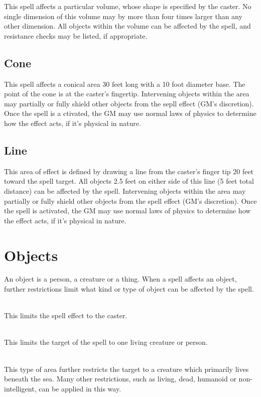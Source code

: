 \begin{multicols*}{2}
This spell affects a particular volume, whose shape is specified by the caster. No single dimension of this volume may by more than four times larger than any other dimension. All objects within the volume can be affected by the spell,
and resistance checks may be listed, if appropriate.
\subsection{Cone}

This spell affects a conical area 30 feet long with a 10 foot diameter base. The point of the cone is at the caster’s fingertip. Intervening objects within the area may partially or
fully shield other objects from the sepll effect (GM's discretion). Once the spell is a ctivated, the GM may use normal laws of physics to determine how the effect acts, if it’s physical in nature.
\subsection{Line}

This area of effect is defined by drawing a line from the caster’s finger tip 20 feet toward the spell target. All objects 2.5 feet on either side of this line (5 feet total distance) can be affected by the spell. Intervening objects within the area may partially or fully shield other objects from the spell effect (GM’s discretion). Once the spell is activated, the GM may use normal laws of physics to determine how the effect acts, if it’s physical in nature.
\section{Objects}
An object is a person, a creature or a thing. When a spell affects an object, further restrictions limit what kind or type of object can be affected by the spell.

\\
This limits the spell effect to the caster.

\\
This limits the target of the spell to one living creature or person.

\\
This type of area further restricts the target to a creature which primarily lives beneath the sea. Many other restrictions, such as living, dead, humanoid or non-intelligent, can be applied in this way.


\end{multicols*}
